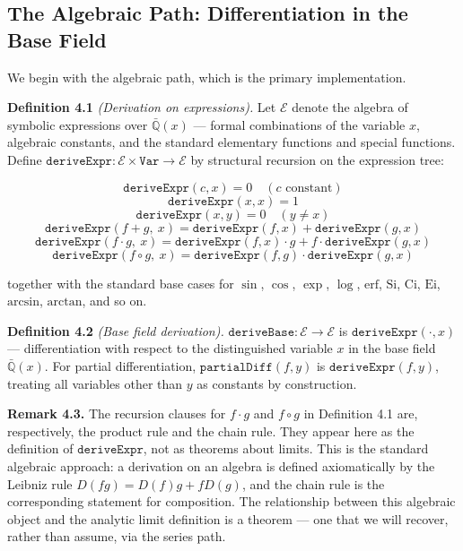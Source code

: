 \documentclass[12pt]{article}
\begin{document}
\subsection{The Algebraic Path: Differentiation in the Base
Field}\label{the-algebraic-path-differentiation-in-the-base-field}

We begin with the algebraic path, which is the primary implementation.

\textbf{Definition 4.1} \emph{(Derivation on expressions).} Let
\(\mathcal{E}\) denote the algebra of symbolic expressions over
\(\bar{\mathbb{Q}}(x)\) --- formal combinations of the variable \(x\),
algebraic constants, and the standard elementary functions and special
functions. Define
\(\mathtt{deriveExpr} : \mathcal{E} \times \mathtt{Var} \to \mathcal{E}\)
by structural recursion on the expression tree:

\[\mathtt{deriveExpr}(c, x) = 0 \quad (c \text{ constant})\]
\[\mathtt{deriveExpr}(x, x) = 1\]
\[\mathtt{deriveExpr}(x, y) = 0 \quad (y \neq x)\]
\[\mathtt{deriveExpr}(f + g,\ x) = \mathtt{deriveExpr}(f, x) + \mathtt{deriveExpr}(g, x)\]
\[\mathtt{deriveExpr}(f \cdot g,\ x) = \mathtt{deriveExpr}(f, x) \cdot g + f \cdot \mathtt{deriveExpr}(g, x)\]
\[\mathtt{deriveExpr}(f \circ g,\ x) = \mathtt{deriveExpr}(f, g) \cdot \mathtt{deriveExpr}(g, x)\]

together with the standard base cases for \(\sin\), \(\cos\), \(\exp\),
\(\log\), \(\mathrm{erf}\), \(\mathrm{Si}\), \(\mathrm{Ci}\),
\(\mathrm{Ei}\), \(\mathrm{arcsin}\), \(\mathrm{arctan}\), and so on.

\textbf{Definition 4.2} \emph{(Base field derivation).}
\(\mathtt{deriveBase} : \mathcal{E} \to \mathcal{E}\) is
\(\mathtt{deriveExpr}(\cdot, x)\) --- differentiation with respect to
the distinguished variable \(x\) in the base field
\(\bar{\mathbb{Q}}(x)\). For partial differentiation,
\(\mathtt{partialDiff}(f, y)\) is \(\mathtt{deriveExpr}(f, y)\),
treating all variables other than \(y\) as constants by construction.

\textbf{Remark 4.3.} The recursion clauses for \(f \cdot g\) and
\(f \circ g\) in Definition 4.1 are, respectively, the product rule and
the chain rule. They appear here as the definition of
\(\mathtt{deriveExpr}\), not as theorems about limits. This is the
standard algebraic approach: a derivation on an algebra is defined
axiomatically by the Leibniz rule \(D(fg) = D(f)g + fD(g)\), and the
chain rule is the corresponding statement for composition. The
relationship between this algebraic object and the analytic limit
definition is a theorem --- one that we will recover, rather than
assume, via the series path.
\end{document}
